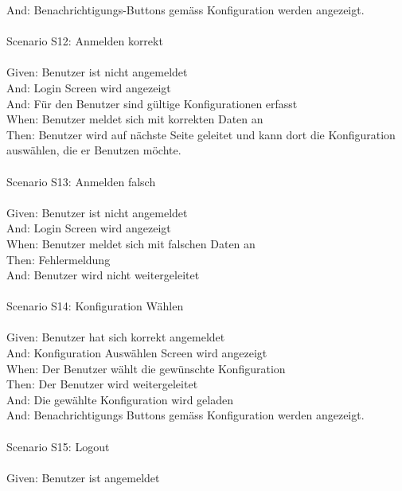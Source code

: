 \begin{tabbing}
    And: \> \> \>    Benachrichtigungs-Buttons gemäss Konfiguration werden angezeigt.\\
    \\
    Scenario S12: \> \> \>  Anmelden korrekt\\ \\
    Given: \> \> \>  Benutzer ist nicht angemeldet\\
    And: \> \> \>    Login Screen wird angezeigt\\
    And: \> \> \>     Für den Benutzer sind gültige Konfigurationen erfasst\\
    When: \> \> \>   Benutzer meldet sich mit korrekten Daten an\\
    Then: \> \> \>   Benutzer wird auf nächste Seite geleitet und kann dort die Konfiguration auswählen, die er Benutzen möchte.\\
    \\
    Scenario S13: \> \> \>  Anmelden falsch\\ \\
    Given: \> \> \>  Benutzer ist nicht angemeldet\\
    And: \> \> \>    Login Screen wird angezeigt\\
    When: \> \> \>   Benutzer meldet sich mit falschen Daten an\\
    Then: \> \> \>   Fehlermeldung\\
    And: \> \> \>  Benutzer wird nicht weitergeleitet\\
    \\
    Scenario S14: \> \> \>  Konfiguration Wählen\\ \\
    Given: \> \> \>  Benutzer hat sich korrekt angemeldet\\
    And: \> \> \>    Konfiguration Auswählen Screen wird angezeigt\\
    When: \> \> \>   Der Benutzer wählt die gewünschte Konfiguration\\
    Then: \> \> \>   Der Benutzer wird weitergeleitet\\
    And: \> \> \>    Die gewählte Konfiguration wird geladen\\
    And: \> \> \>    Benachrichtigungs Buttons gemäss Konfiguration werden angezeigt.\\
    \\
    Scenario S15: \>  \> \> Logout\\ \\
    Given: \> \> \>  Benutzer ist angemeldet\\

\end{tabbing}

